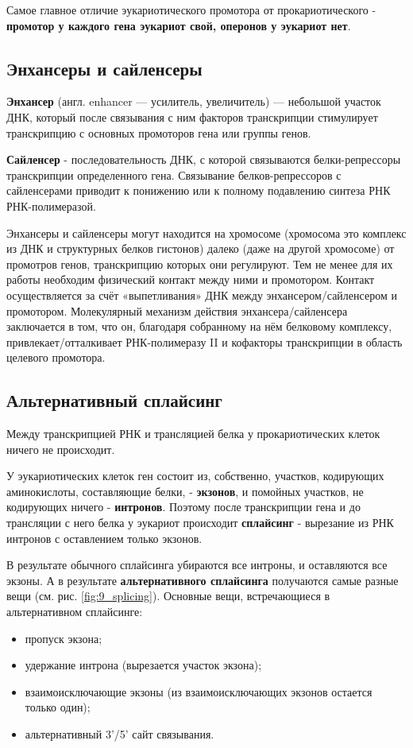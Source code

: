 Самое главное отличие эукариотического промотора от прокариотического - \textbf{промотор у каждого гена эукариот свой, оперонов у эукариот нет}.

\subsection{Энхансеры и сайленсеры}
\textbf{Энхансер} (англ. enhancer — усилитель, увеличитель) — небольшой участок ДНК, который после связывания с ним факторов транскрипции стимулирует транскрипцию с основных промоторов гена или группы генов.

\textbf{Сайленсер} - последовательность ДНК, с которой связываются белки-репрессоры транскрипции определенного гена. Связывание белков-репрессоров с сайленсерами приводит к понижению или к полному подавлению синтеза РНК РНК-полимеразой. 

Энхансеры и сайленсеры могут находится на хромосоме (хромосома это комплекс из ДНК и структурных белков гистонов) далеко (даже на другой хромосоме) от промотров генов, транскрипцию которых они регулируют. Тем не менее для их работы необходим физический контакт между ними и промотором. Контакт осуществляется за счёт «выпетливания» ДНК между энхансером/сайленсером и промотором. Молекулярный механизм действия энхансера/сайленсера заключается в том, что он, благодаря собранному на нём белковому комплексу, привлекает/отталкивает РНК-полимеразу II и кофакторы транскрипции в область целевого промотора.

\subsection{Альтернативный сплайсинг}
Между транскрипцией РНК и трансляцией белка у прокариотических клеток ничего не происходит. 

У эукариотических клеток ген состоит из, собственно, участков, кодирующих аминокислоты, составляющие белки, - \textbf{экзонов}, и помойных участков, не кодирующих ничего - \textbf{интронов}. Поэтому после транскрипции гена и до трансляции с него белка у эукариот происходит \textbf{сплайсинг} - вырезание из РНК интронов с оставлением только экзонов.

В результате обычного сплайсинга убираются все интроны, и оставляются все экзоны. А в результате \textbf{альтернативного сплайсинга} получаются самые разные вещи (см. рис. \ref{fig:9_splicing}). Основные вещи, встречающиеся в альтернативном сплайсинге:
\begin{itemize}
    \item пропуск экзона;
    \item удержание интрона (вырезается участок экзона);
    \item взаимоисключающие экзоны (из взаимоисключающих экзонов остается только один);
    \item альтернативный 3'/5' сайт связывания.
\end{itemize}

